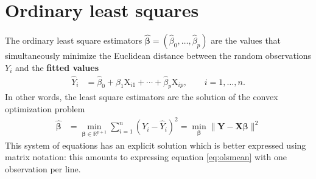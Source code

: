 \documentclass[
  11pt,
  letterpaper,
]{book}
\theoremstyle{definition}
\theoremstyle{definition}
\theoremstyle{definition}
\theoremstyle{remark}
\begin{document}
\hypertarget{ordinary-least-squares}{%
\section{Ordinary least squares}\label{ordinary-least-squares}}

The ordinary least square estimators \(\widehat{\boldsymbol{\beta}}=(\widehat{\beta}_0, \ldots, \widehat{\beta}_p)\) are the values that simultaneously minimize the Euclidean distance between the random observations \(Y_i\) and the \textbf{fitted values}
\begin{align*}
 \widehat{Y}_i &= \widehat{\beta}_0 + \widehat{\beta}_1 \mathrm{X}_{i1} + \cdots + \widehat{\beta}_p \mathrm{X}_{ip}, \qquad i =1, \ldots, n.
\end{align*}
In other words, the least square estimators are the solution of the convex optimization problem
\begin{align*}
\widehat{\boldsymbol{\beta}} &=\min_{\boldsymbol{\beta} \in \mathbb{R}^{p+1}}\sum_{i=1}^n (Y_i-\widehat{Y}_i)^2= \min_{\boldsymbol{\beta}} \|\boldsymbol{Y}-\mathbf{X}\boldsymbol{\beta}\|^2
\end{align*}
This system of equations has an explicit solution which is better expressed using matrix notation: this amounts to expressing equation \eqref{eq:olsmean} with one observation per line.
\end{document}
